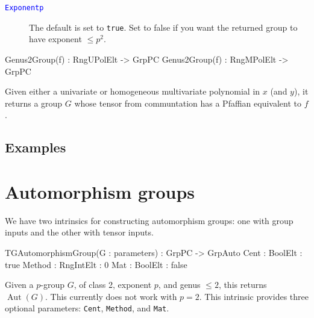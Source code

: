 \documentclass{documentation}
\DeclareMathOperator{\Aut}{Aut}
\begin{document}
\begin{description}
\item[\textcolor{blue}{\tt Exponentp}]
The default is set to {\tt true}.
Set to false if you want the returned group to have exponent $\leq p^2$.  
\end{description}

\begin{intrinsics}
Genus2Group(f) : RngUPolElt -> GrpPC
Genus2Group(f) : RngMPolElt -> GrpPC
\end{intrinsics}

Given either a univariate or homogeneous multivariate polynomial in $x$ (and $y$), it returns a group $G$ whose tensor from communtation has a Pfaffian equivalent to $f$.

\section{Examples}

\chapter{Automorphism groups}

We have two intrinsics for constructing automorphism groups: one with group inputs and the other with tensor inputs. 

\begin{intrinsics}
TGAutomorphismGroup(G : parameters) : GrpPC -> GrpAuto
    Cent : BoolElt : true
    Method : RngIntElt : 0 
    Mat : BoolElt : false
\end{intrinsics}

Given a $p$-group $G$, of class 2, exponent $p$, and genus $\leq 2$, this returns $\Aut(G)$.
This currently does not work with $p=2$.
This intrinsic provides three optional parameters: {\tt Cent}, {\tt Method}, and {\tt Mat}.
\end{document}
